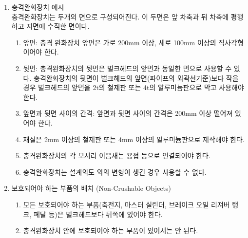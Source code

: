 \documentclass[final,a4paper,10pt]{report}
\begin{document}
\begin{enumerate}
  \item\label{rule:formula-technical.impact-attenuator.reference-design} 충격완화장치 예시 \label{item:충격완화장치 예시}\\
    충격완화장치는 두개의 면으로 구성되어진다. 이 두면은 앞 차축과 뒤 차축에 평행하고 지면에 수직한 면이다.
    \begin{enumerate}
      \item\label{rule:formula-technical.impact-attenuator.reference-design.front-face-min-200x100mm} 앞면: 충격 완화장치 앞면은 가로 200mm 이상, 세로 100mm 이상의 직사각형이어야 한다.
      \item\label{rule:formula-technical.impact-attenuator.reference-design.rear-face-matches-bulkhead} 뒷면: 충격완화장치의 뒷면은 벌크헤드의 앞면과 동일한 면으로 사용할 수 있다. 충격완화장치의 뒷면이 벌크헤드의 앞면(파이프의 외곽선기준)보다 작을 경우 벌크헤드의 앞면을 2t의 철제판 또는 4t의 알루미늄판으로 막고 사용해야 한다.
      \item\label{rule:formula-technical.impact-attenuator.reference-design.min-depth-200mm} 앞면과 뒷면 사이의 간격: 앞면과 뒷면 사이의 간격은 200mm 이상 떨어져 있어야 한다.
      \item\label{rule:formula-technical.impact-attenuator.reference-design.plate-thickness-by-material} 재질은 2mm 이상의 철제판 또는 4mm 이상의 알루미늄판으로 제작해야 한다.
      \item\label{rule:formula-technical.impact-attenuator.reference-design.welded-corner-joints} 충격완화장치의 각 모서리 이음새는 용접 등으로 연결되어야 한다.
      \item\label{rule:formula-technical.impact-attenuator.reference-design.no-use-if-deformed} 충격완화장치는 설계의도 외의 변형이 생긴 경우 사용할 수 없다.

    \end{enumerate}

  \item\label{rule:formula-technical.impact-attenuator.non-crushable-objects} 보호되어야 하는 부품의 배치 (Non-Crushable Objects)
    \begin{enumerate}
      \item\label{rule:formula-technical.impact-attenuator.non-crushable-objects.behind-bulkhead} 모든 보호되어야 하는 부품(축전지, 마스터 실린더, 브레이크 오일 리져버 탱크, 페달 등)은 벌크헤드보다 뒤쪽에 있어야 한다.
      \item\label{rule:formula-technical.impact-attenuator.non-crushable-objects.not-inside-attenuator} 충격완화장치 안에 보호되어야 하는 부품이 있어서는 안 된다.
    \end{enumerate}
\end{enumerate}
\end{document}

